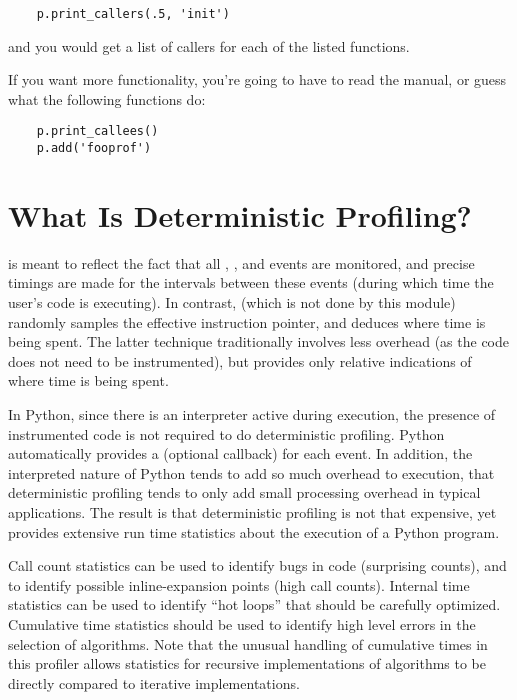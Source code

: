 \begin{verbatim}
    p.print_callers(.5, 'init')
\end{verbatim}

and you would get a list of callers for each of the listed functions. 

If you want more functionality, you're going to have to read the
manual, or guess what the following functions do:

\begin{verbatim}
    p.print_callees()
    p.add('fooprof')
\end{verbatim}


\section{What Is Deterministic Profiling?}

 is meant to reflect the fact that all
, , and  events
are monitored, and precise timings are made for the intervals between
these events (during which time the user's code is executing).  In
contrast,  (which is not done by this
module) randomly samples the effective instruction pointer, and
deduces where time is being spent.  The latter technique traditionally
involves less overhead (as the code does not need to be instrumented),
but provides only relative indications of where time is being spent.

In Python, since there is an interpreter active during execution, the
presence of instrumented code is not required to do deterministic
profiling.  Python automatically provides a  (optional
callback) for each event.  In addition, the interpreted nature of
Python tends to add so much overhead to execution, that deterministic
profiling tends to only add small processing overhead in typical
applications.  The result is that deterministic profiling is not that
expensive, yet provides extensive run time statistics about the
execution of a Python program.

Call count statistics can be used to identify bugs in code (surprising
counts), and to identify possible inline-expansion points (high call
counts).  Internal time statistics can be used to identify ``hot
loops'' that should be carefully optimized.  Cumulative time
statistics should be used to identify high level errors in the
selection of algorithms.  Note that the unusual handling of cumulative
times in this profiler allows statistics for recursive implementations
of algorithms to be directly compared to iterative implementations.


